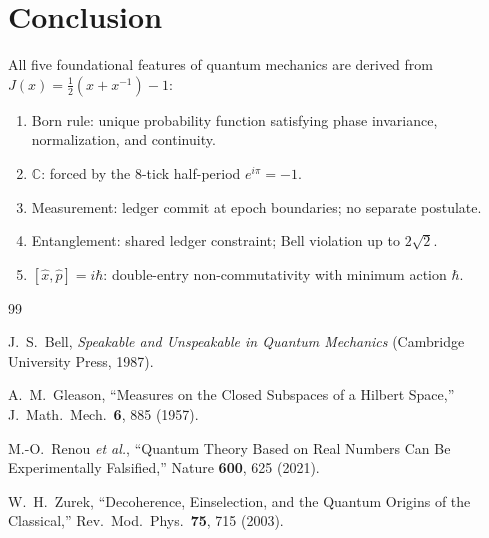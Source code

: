 \documentclass[12pt,a4paper]{article}
\theoremstyle{definition}
\theoremstyle{remark}
\begin{document}
\section{Conclusion}
\label{sec:conclusion}

All five foundational features of quantum mechanics are derived
from $J(x) = \tfrac{1}{2}(x + x^{-1}) - 1$:
\begin{enumerate}[nosep]
  \item Born rule: unique probability function satisfying phase
  invariance, normalization, and continuity.
  \item $\mathbb{C}$: forced by the 8-tick half-period
  $e^{i\pi} = -1$.
  \item Measurement: ledger commit at epoch boundaries;
  no separate postulate.
  \item Entanglement: shared ledger constraint; Bell violation
  up to $2\sqrt{2}$.
  \item $[\hat{x}, \hat{p}] = i\hbar$: double-entry
  non-commutativity with minimum action $\hbar$.
\end{enumerate}

\begin{thebibliography}{99}

J.~S.~Bell, \emph{Speakable and Unspeakable in Quantum Mechanics}
(Cambridge University Press, 1987).

A.~M.~Gleason, ``Measures on the Closed Subspaces of a Hilbert
Space,'' J.\ Math.\ Mech.\ \textbf{6}, 885 (1957).

M.-O.~Renou \emph{et al.}, ``Quantum Theory Based on Real
Numbers Can Be Experimentally Falsified,'' Nature \textbf{600},
625 (2021).

W.~H.~Zurek, ``Decoherence, Einselection, and the Quantum Origins
of the Classical,'' Rev.\ Mod.\ Phys.\ \textbf{75}, 715 (2003).

\end{thebibliography}
\end{document}
